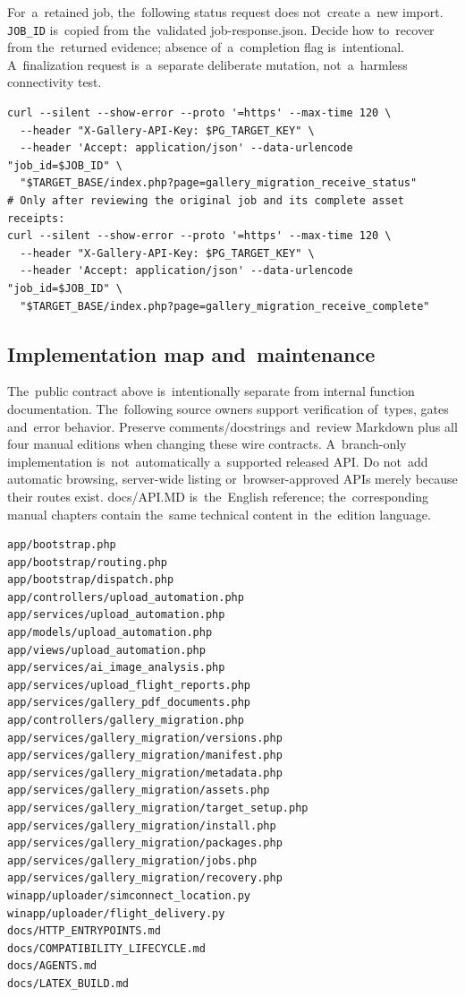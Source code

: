 \documentclass[11pt,a4paper]{article}
\newcommand{\codeword}[1]{\nolinkurl{#1}}
\begin{document}
For~a~retained job, the~following status request does not~create a~new import.
\codeword{JOB_ID} is~copied from the~validated job-response.json. Decide how to~recover from
the~returned evidence; absence of~a~completion flag is~intentional. A~finalization request
is~a~separate deliberate mutation, not~a~harmless connectivity test.

\begin{lstlisting}[language={}]
curl --silent --show-error --proto '=https' --max-time 120 \
  --header "X-Gallery-API-Key: $PG_TARGET_KEY" \
  --header 'Accept: application/json' --data-urlencode "job_id=$JOB_ID" \
  "$TARGET_BASE/index.php?page=gallery_migration_receive_status"
# Only after reviewing the original job and its complete asset receipts:
curl --silent --show-error --proto '=https' --max-time 120 \
  --header "X-Gallery-API-Key: $PG_TARGET_KEY" \
  --header 'Accept: application/json' --data-urlencode "job_id=$JOB_ID" \
  "$TARGET_BASE/index.php?page=gallery_migration_receive_complete"
\end{lstlisting}

\subsection{\texorpdfstring{Implementation map and~maintenance}{Implementation map and maintenance}}

\label{api352:source-map}

The~public contract above is~intentionally separate from internal function documentation.
The~following source owners support verification of~types, gates and~error behavior.
Preserve comments/docstrings and~review Markdown plus all four manual editions when changing
these wire contracts. A~branch-only implementation is~not~automatically a~supported released
API. Do not~add automatic browsing, server-wide listing or~browser-approved APIs merely
because their routes exist. docs/API.MD is~the~English reference; the~corresponding manual
chapters contain the~same technical content in~the~edition language.

\begin{lstlisting}[language={}]
app/bootstrap.php
app/bootstrap/routing.php
app/bootstrap/dispatch.php
app/controllers/upload_automation.php
app/services/upload_automation.php
app/models/upload_automation.php
app/views/upload_automation.php
app/services/ai_image_analysis.php
app/services/upload_flight_reports.php
app/services/gallery_pdf_documents.php
app/controllers/gallery_migration.php
app/services/gallery_migration/versions.php
app/services/gallery_migration/manifest.php
app/services/gallery_migration/metadata.php
app/services/gallery_migration/assets.php
app/services/gallery_migration/target_setup.php
app/services/gallery_migration/install.php
app/services/gallery_migration/packages.php
app/services/gallery_migration/jobs.php
app/services/gallery_migration/recovery.php
winapp/uploader/simconnect_location.py
winapp/uploader/flight_delivery.py
docs/HTTP_ENTRYPOINTS.md
docs/COMPATIBILITY_LIFECYCLE.md
docs/AGENTS.md
docs/LATEX_BUILD.md
\end{lstlisting}
\end{document}
